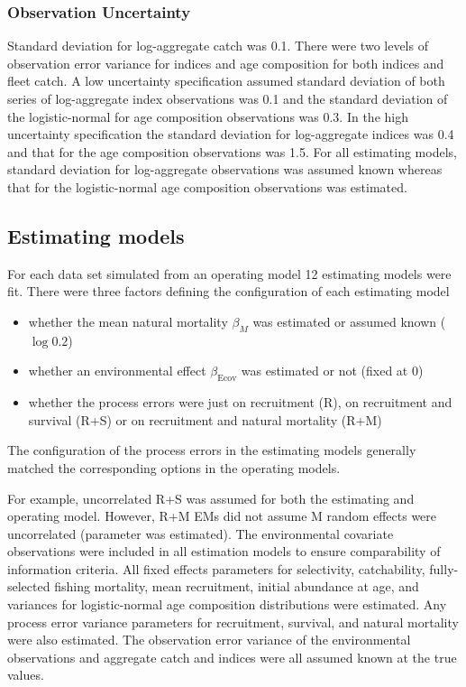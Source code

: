 \documentclass[
  12pt,
]{article}
\begin{document}
\hypertarget{observation-uncertainty}{%
\subsubsection*{Observation Uncertainty}\label{observation-uncertainty}}

Standard deviation for log-aggregate catch was 0.1. There were two levels of observation error variance for indices and age composition for both indices and fleet catch. A low uncertainty specification assumed standard deviation of both series of log-aggregate index observations was 0.1 and the standard deviation of the logistic-normal for age composition observations was 0.3. In the high uncertainty specification the standard deviation for log-aggregate indices was 0.4 and that for the age composition observations was 1.5. For all estimating models, standard deviation for log-aggregate observations was assumed known whereas that for the logistic-normal age composition observations was estimated.

\hypertarget{estimating-models}{%
\subsection*{Estimating models}\label{estimating-models}}

For each data set simulated from an operating model 12 estimating models were fit. There were three factors defining the configuration of each estimating model

\begin{itemize}
\item whether the mean natural mortality $\beta_M$ was estimated or assumed known ($\log 0.2$)
\item whether an environmental effect $\beta_\text{Ecov}$ was estimated or not (fixed at 0)
\item whether the process errors were just on recruitment (R), on recruitment and survival (R+S) or on recruitment and natural mortality (R+M)
\end{itemize}

The configuration of the process errors in the estimating models generally matched the corresponding options in the operating models.

For example, uncorrelated R+S was assumed for both the estimating and operating model. However, R+M EMs did not assume M random effects were uncorrelated (parameter was estimated). The environmental covariate observations were included in all estimation models to ensure comparability of information criteria. All fixed effects parameters for selectivity, catchability, fully-selected fishing mortality, mean recruitment, initial abundance at age, and variances for logistic-normal age composition distributions were estimated. Any process error variance parameters for recruitment, survival, and natural mortality were also estimated. The observation error variance of the environmental observations and aggregate catch and indices were all assumed known at the true values.
\end{document}
